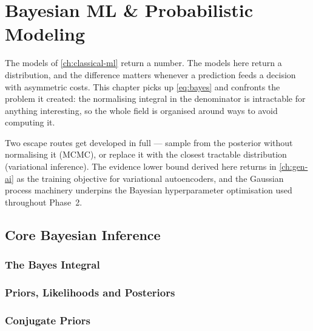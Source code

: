 %
\chapter{Bayesian ML \& Probabilistic Modeling}
\label{ch:bayesian-ml}

The models of \cref{ch:classical-ml} return a number. The models here return a
distribution, and the difference matters whenever a prediction feeds a decision
with asymmetric costs. This chapter picks up \cref{eq:bayes} and confronts the
problem it created: the normalising integral in the denominator is intractable
for anything interesting, so the whole field is organised around ways to avoid
computing it.

Two escape routes get developed in full --- sample from the posterior without
normalising it (MCMC), or replace it with the closest tractable distribution
(variational inference). The evidence lower bound derived here returns in
\cref{ch:gen-ai} as the training objective for variational autoencoders, and
the Gaussian process machinery underpins the Bayesian hyperparameter
optimisation used throughout Phase~2.

\section{Core Bayesian Inference}
\label{sec:bayesian-inference}

\subsection{The Bayes Integral}


\subsection{Priors, Likelihoods and Posteriors}

\subsection{Conjugate Priors}

